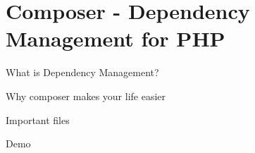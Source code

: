 \section{Composer - Dependency Management for PHP}

\begin{frame}{What is Dependency Management?}
\end{frame}

\begin{frame}{Why composer makes your life easier}
\end{frame}

\begin{frame}{Important files}
\end{frame}

\begin{frame}[standout]
	Demo
\end{frame}